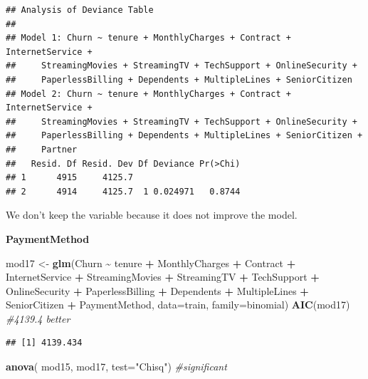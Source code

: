 \documentclass[
  twoside]{article}
\newenvironment{Shaded}{\begin{snugshade}}{\end{snugshade}}
\newcommand{\AttributeTok}[1]{\textcolor[rgb]{0.13,0.29,0.53}{#1}}
\newcommand{\CommentTok}[1]{\textcolor[rgb]{0.56,0.35,0.01}{\textit{#1}}}
\newcommand{\FunctionTok}[1]{\textcolor[rgb]{0.13,0.29,0.53}{\textbf{#1}}}
\newcommand{\NormalTok}[1]{#1}
\newcommand{\OtherTok}[1]{\textcolor[rgb]{0.56,0.35,0.01}{#1}}
\newcommand{\SpecialCharTok}[1]{\textcolor[rgb]{0.81,0.36,0.00}{\textbf{#1}}}
\newcommand{\StringTok}[1]{\textcolor[rgb]{0.31,0.60,0.02}{#1}}
\begin{document}
\begin{verbatim}
## Analysis of Deviance Table
## 
## Model 1: Churn ~ tenure + MonthlyCharges + Contract + InternetService + 
##     StreamingMovies + StreamingTV + TechSupport + OnlineSecurity + 
##     PaperlessBilling + Dependents + MultipleLines + SeniorCitizen
## Model 2: Churn ~ tenure + MonthlyCharges + Contract + InternetService + 
##     StreamingMovies + StreamingTV + TechSupport + OnlineSecurity + 
##     PaperlessBilling + Dependents + MultipleLines + SeniorCitizen + 
##     Partner
##   Resid. Df Resid. Dev Df Deviance Pr(>Chi)
## 1      4915     4125.7                     
## 2      4914     4125.7  1 0.024971   0.8744
\end{verbatim}

We don't keep the variable because it does not improve the model.

\textbf{PaymentMethod}

\begin{Shaded}
\begin{Highlighting}[]
\NormalTok{mod17 }\OtherTok{\textless{}{-}} \FunctionTok{glm}\NormalTok{(Churn }\SpecialCharTok{\textasciitilde{}}\NormalTok{ tenure }\SpecialCharTok{+}\NormalTok{ MonthlyCharges }\SpecialCharTok{+}\NormalTok{ Contract }\SpecialCharTok{+}\NormalTok{ InternetService }\SpecialCharTok{+} 
\NormalTok{               StreamingMovies }\SpecialCharTok{+}\NormalTok{ StreamingTV }\SpecialCharTok{+}\NormalTok{ TechSupport }\SpecialCharTok{+}\NormalTok{ OnlineSecurity }\SpecialCharTok{+} 
\NormalTok{               PaperlessBilling }\SpecialCharTok{+}\NormalTok{ Dependents }\SpecialCharTok{+}\NormalTok{ MultipleLines }\SpecialCharTok{+}\NormalTok{ SeniorCitizen }\SpecialCharTok{+} 
\NormalTok{               PaymentMethod, }\AttributeTok{data=}\NormalTok{train, }\AttributeTok{family=}\NormalTok{binomial) }
\FunctionTok{AIC}\NormalTok{(mod17) }\CommentTok{\#4139.4 better}
\end{Highlighting}
\end{Shaded}

\begin{verbatim}
## [1] 4139.434
\end{verbatim}

\begin{Shaded}
\begin{Highlighting}[]
\FunctionTok{anova}\NormalTok{( mod15, mod17,  }\AttributeTok{test=}\StringTok{"Chisq"}\NormalTok{) }\CommentTok{\#significant}
\end{Highlighting}
\end{Shaded}
\end{document}
